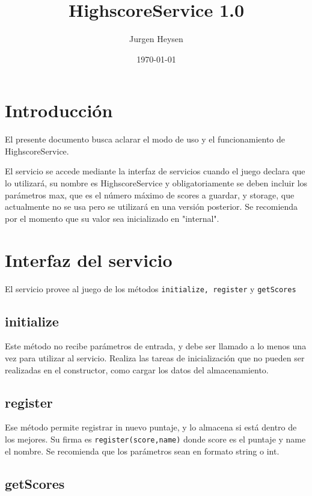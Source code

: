 \documentclass[language=spanish]{article}
\begin{document}
\title{HighscoreService 1.0}
\author{Jurgen Heysen}
\date{\today}
\maketitle
\newpage

\tableofcontents
\newpage

\section{Introducción}

El presente documento busca aclarar el modo de uso y el funcionamiento de HighscoreService.

El servicio se accede mediante la interfaz de servicios cuando el juego declara que lo utilizará, su nombre es HighscoreService y obligatoriamente se deben incluir los parámetros max, que es el número máximo de scores a guardar, y storage, que actualmente no se usa pero se utilizará en una versión posterior. Se recomienda por el momento que su valor sea inicializado en "internal".

\section{Interfaz del servicio}

El servicio provee al juego de los métodos {\tt initialize, register} y {\tt getScores}

\subsection{initialize}

Este método no recibe parámetros de entrada, y debe ser llamado a lo menos una vez para utilizar al servicio. Realiza las tareas de inicialización que no pueden ser realizadas en el constructor, como cargar los datos del almacenamiento.

\subsection{register}

Ese método permite registrar in nuevo puntaje, y lo almacena si está dentro de los mejores. Su firma es {\tt register(score,name)} donde score es el puntaje y name el nombre. Se recomienda que los parámetros sean en formato string o int.

\subsection{getScores}
\end{document}
